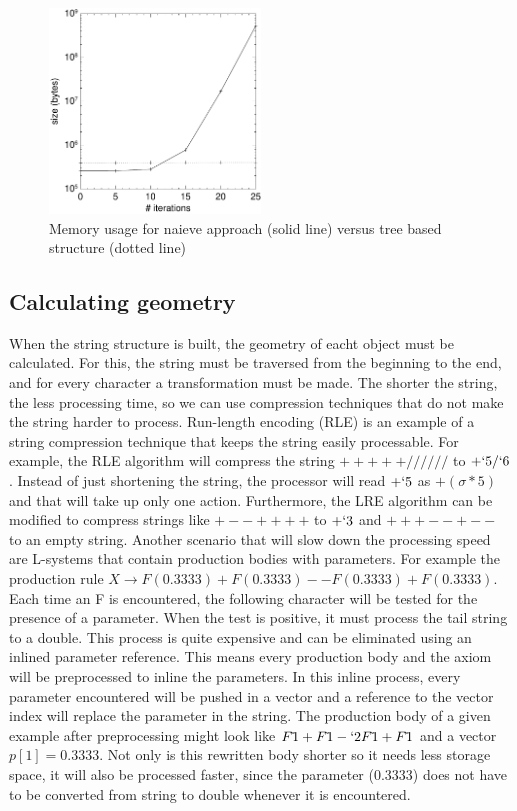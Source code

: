 \documentclass[11pt,a4paper]{article}
\begin{document}
\begin{figure}[h!]
  \centering
  \includegraphics[width=0.5\textwidth]{bench.pdf}
  \caption{Memory usage for naieve approach (solid line) versus tree based structure (dotted line)}
  \label{fig:bench}
\end{figure}

\subsection{Calculating geometry}

When the string structure is built, the geometry of eacht object must be calculated. For this, the string must be traversed from the beginning to the end, and for every character a transformation must be made. The shorter the string, the less processing time, so we can use compression techniques that do not make the string harder to process. Run-length encoding (RLE) is an example of a string compression technique that keeps the string easily processable. For example, the RLE algorithm will compress the string $+++++//////$ to $+`5/`6$. Instead of just shortening the string, the processor will read $+`5$ as $+(\sigma*5)$ and that will take up only one action. Furthermore, the LRE algorithm can be modified to compress strings like $+--++++$ to $+`3$ and $+++--+--$ to an empty string.
Another scenario that will slow down the processing speed are L-systems that contain production bodies with parameters. For example the production rule $X \rightarrow F(0.3333)+F(0.3333)--F(0.3333)+F(0.3333)$. Each time an F is encountered, the following character will be tested for the presence of a parameter. When the test is positive, it must process the tail string to a double. This process is quite expensive and can be eliminated using an inlined parameter reference. This means every production body and the axiom will be preprocessed to inline the parameters. In this inline process, every parameter encountered will be pushed in a vector and a reference to the vector index will replace the parameter in the string. The production body of a given example after preprocessing might look like $F\tilde{ } 1+F\tilde{ } 1-`2F\tilde{ } 1+F\tilde{ } 1$ and a vector $p[1]=0.3333$. Not only is this rewritten body shorter so it needs less storage space, it will also be processed faster, since the parameter (0.3333) does not have to be converted from string to double whenever it is encountered.
\end{document}
